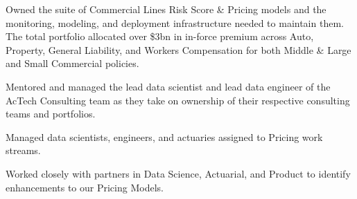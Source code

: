 \documentclass[letterpaper]{deedy-resume} %
\begin{document}
\begin{minipage}[t]{0.68\textwidth}
  \hfill
  \begin{tightitemize}
  \item Owned the suite of Commercial Lines Risk Score \& Pricing models
    and the monitoring, modeling, and deployment infrastructure needed
    to maintain them. The total portfolio allocated over \$3bn in in-force
    premium across Auto, Property, General Liability, and
    Workers Compensation for both Middle \& Large and Small Commercial
    policies.
  \item  Mentored and managed the lead data scientist and lead data
    engineer of the AcTech Consulting team as they take on ownership
    of their respective consulting teams and portfolios.
  \item Managed data scientists, engineers, and actuaries assigned to Pricing work
    streams.
  \item Worked closely with partners in Data Science, Actuarial, and
    Product to identify enhancements to our Pricing Models.

  \end{tightitemize}
  \sectionspace

  

  

  


\end{minipage} %
\newpage





\end{document}
